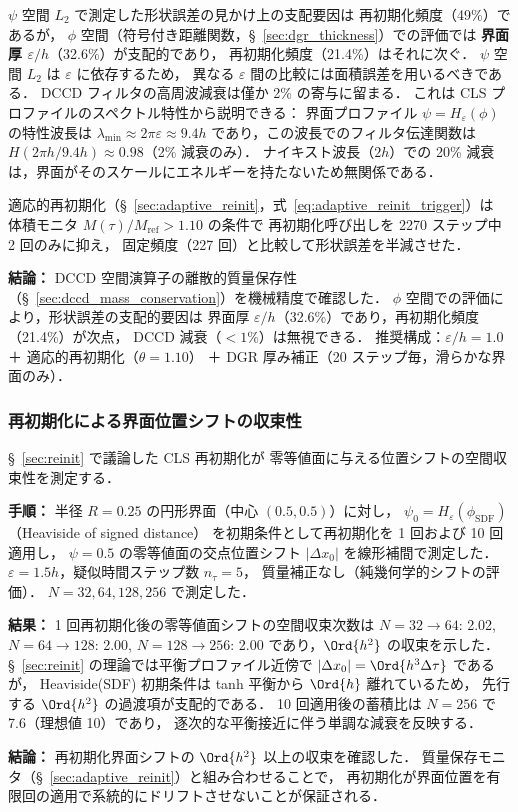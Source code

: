 $\psi$ 空間 $L_2$ で測定した形状誤差の見かけ上の支配要因は
再初期化頻度（49\%）であるが，
$\phi$ 空間（符号付き距離関数，§~\ref{sec:dgr_thickness}）での評価では
\textbf{界面厚 $\varepsilon/h$}（32.6\%）が支配的であり，
再初期化頻度（21.4\%）はそれに次ぐ．
$\psi$ 空間 $L_2$ は $\varepsilon$ に依存するため，
異なる $\varepsilon$ 間の比較には面積誤差を用いるべきである．
DCCD フィルタの高周波減衰は僅か 2\% の寄与に留まる．
これは CLS プロファイルのスペクトル特性から説明できる：
界面プロファイル $\psi = H_\varepsilon(\phi)$ の特性波長は
$\lambda_{\min} \approx 2\pi\varepsilon \approx 9.4h$
であり，この波長でのフィルタ伝達関数は $H(2\pi h / 9.4h) \approx 0.98$（2\% 減衰のみ）．
ナイキスト波長（$2h$）での 20\% 減衰は，界面がそのスケールにエネルギーを持たないため無関係である．

適応的再初期化（§~\ref{sec:adaptive_reinit}，式~\eqref{eq:adaptive_reinit_trigger}）は
体積モニタ $M(\tau)/M_{\mathrm{ref}} > 1.10$ の条件で
再初期化呼び出しを 2270 ステップ中 2 回のみに抑え，
固定頻度（227 回）と比較して形状誤差を半減させた．

\noindent\textbf{結論：}
DCCD 空間演算子の離散的質量保存性（§~\ref{sec:dccd_mass_conservation}）を機械精度で確認した．
$\phi$ 空間での評価により，形状誤差の支配的要因は
界面厚 $\varepsilon/h$（32.6\%）であり，再初期化頻度（21.4\%）が次点，
DCCD 減衰（$< 1\%$）は無視できる．
推奨構成：$\varepsilon/h = 1.0$ ＋ 適応的再初期化（$\theta = 1.10$）
＋ DGR 厚み補正（20 ステップ毎，滑らかな界面のみ）．

\subsubsection{再初期化による界面位置シフトの収束性}
\label{sec:verify_reinit_shift}

§~\ref{sec:reinit} で議論した CLS 再初期化が
零等値面に与える位置シフトの空間収束性を測定する．

\noindent\textbf{手順：}
半径 $R = 0.25$ の円形界面（中心 $(0.5, 0.5)$）に対し，
$\psi_0 = H_\varepsilon(\phi_{\mathrm{SDF}})$（Heaviside of signed distance）
を初期条件として再初期化を 1 回および 10 回適用し，
$\psi = 0.5$ の零等値面の交点位置シフト $|\Delta x_0|$ を線形補間で測定した．
$\varepsilon = 1.5h$，疑似時間ステップ数 $n_\tau = 5$，
質量補正なし（純幾何学的シフトの評価）．
$N = 32, 64, 128, 256$ で測定した．

\noindent\textbf{結果：}
1 回再初期化後の零等値面シフトの空間収束次数は
$N = 32 \to 64$: 2.02,
$N = 64 \to 128$: 2.00,
$N = 128 \to 256$: 2.00
であり，$\Ord{h^2}$ の収束を示した．
§~\ref{sec:reinit} の理論では平衡プロファイル近傍で
$|\Delta x_0| = \Ord{h^3 \Delta\tau}$ であるが，
Heaviside(SDF) 初期条件は tanh 平衡から $\Ord{h}$ 離れているため，
先行する $\Ord{h^2}$ の過渡項が支配的である．
10 回適用後の蓄積比は $N = 256$ で 7.6（理想値 10）であり，
逐次的な平衡接近に伴う単調な減衰を反映する．

\noindent\textbf{結論：}
再初期化界面シフトの $\Ord{h^2}$ 以上の収束を確認した．
質量保存モニタ（§~\ref{sec:adaptive_reinit}）と組み合わせることで，
再初期化が界面位置を有限回の適用で系統的にドリフトさせないことが保証される．

